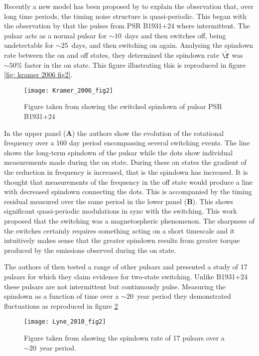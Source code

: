 Recently a new model has been proposed by \citet{Lyne2010} to explain the
observation that, over long time periods, the timing noise structure is
quasi-periodic. This began with the observation by \citet{Kramer2006} that the
pulses from PSR B1931+24 where intermittent. The pulsar acts as a normal pulsar
for $\sim10$~days and then switches off, being undetectable for $\sim25$~days,
and then switching on again. Analysing the spindown rate between the on and off
states, they determined the spindown rate $\dot{\f}$ was $\sim50\%$ faster in
the on state. This figure illustrating this is reproduced in figure \ref{fig:
kramer 2006 fig2}.
\begin{figure}
    \centering
    \texttt{[image: Kramer\_2006\_fig2]}
    \caption{Figure taken from \citet{Kramer2006} showing the switched spindown
             of pulsar PSR B1931+24}
    \label{fig: kramer 2006 fig2}
\end{figure}
In the  upper panel (\textbf{A}) the authors show the evolution of the
rotational frequency over a 160 day period encompassing several switching
events. The line shows the long-term spindown of the pulsar while the dots show
individual measurements made during the on state. During these on states the
gradient of the reduction in frequency is increased, that is the spindown has
increased. It is thought that measurements of the frequency in the off state
would produce a line with decreased spindown connecting the dots. This is
accompanied by the timing residual measured over the same period in the lower
panel (\textbf{B}). This shows significant quasi-periodic modulations in sync
with the switching. This work proposed that the switching was a magnetospheric
phenomenon. The sharpness of the switches certainly requires something acting
on a short timescale and it intuitively makes sense that the greater spindown
results from greater torque produced by the emissions observed during the on
state.

The authors of \citet{Lyne2010} then tested a range of other pulsars and
presented a study of 17 pulsars for which they claim evidence for two-state
switching. Unlike B1931+24 these pulsars are not intermittent but 
continuously pulse. Measuring the spindown as a function of time over a
$\sim20$~year period they demonstrated fluctuations as reproduced in figure
\ref{fig: lyne 2010 fig2}

\begin{figure}
    \centering
    \texttt{[image: Lyne\_2010\_fig2]}
    \caption{Figure taken from \citet{Lyne2010} showing the spindown rate
             of 17 pulsars over a $\sim20$~year period.}
    \label{fig: lyne 2010 fig2}
\end{figure}


